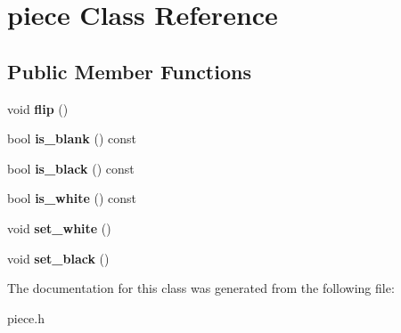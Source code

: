 \hypertarget{classpiece}{}\section{piece Class Reference}
\label{classpiece}
\subsection*{Public Member Functions}
\begin{DoxyCompactItemize}
\item 
void {\bfseries flip} ()\hypertarget{classpiece_ab898c5827a5859e4cddc9d61a814a873}{}\label{classpiece_ab898c5827a5859e4cddc9d61a814a873}

\item 
bool {\bfseries is\+\_\+blank} () const \hypertarget{classpiece_af8e5afd9e1eb6b367c7da643c94c7113}{}\label{classpiece_af8e5afd9e1eb6b367c7da643c94c7113}

\item 
bool {\bfseries is\+\_\+black} () const \hypertarget{classpiece_abb229bd7452561f1f3aa794e5561aa60}{}\label{classpiece_abb229bd7452561f1f3aa794e5561aa60}

\item 
bool {\bfseries is\+\_\+white} () const \hypertarget{classpiece_a229a0c4b29e449350b2c3ba019e6c9a9}{}\label{classpiece_a229a0c4b29e449350b2c3ba019e6c9a9}

\item 
void {\bfseries set\+\_\+white} ()\hypertarget{classpiece_a31480899f2a591fdb22d97933303e19d}{}\label{classpiece_a31480899f2a591fdb22d97933303e19d}

\item 
void {\bfseries set\+\_\+black} ()\hypertarget{classpiece_a273d63d07b6ea973b2fc4f7e1b56ea10}{}\label{classpiece_a273d63d07b6ea973b2fc4f7e1b56ea10}

\end{DoxyCompactItemize}


The documentation for this class was generated from the following file\+:\begin{DoxyCompactItemize}
\item 
piece.\+h\end{DoxyCompactItemize}
